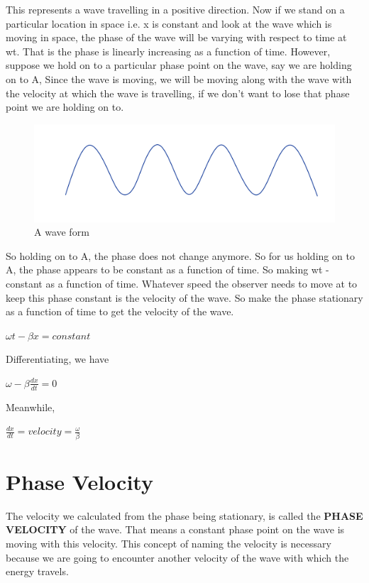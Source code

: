 This represents a wave travelling in a positive direction. Now if we stand on a particular location in space i.e. x is constant and look at the wave which is moving in space, the phase of the wave will be varying with respect to time at wt. That is the phase is linearly increasing as a function of time. However, suppose we hold on to a particular phase point on the wave, say we are holding on to A, Since the wave is moving, we will be moving along with the wave with the velocity at which the wave is travelling, if we don't want to lose that phase point we are holding on to.
\begin{figure}[h]
\centering
\includegraphics[width=1\linewidth]{./graphics/Bello264}
\caption{A wave form}
\end{figure}

So holding on to A, the phase does not change anymore. So for us holding on to A, the phase appears to be constant as a function of time. So making wt -   constant as a function of time. Whatever speed the observer needs to move at to keep this phase constant is the velocity of the wave. So make the phase stationary as a function of time to get the velocity of the wave.
\begin{center}
$\omega t-\beta x = constant$
\end{center}

Differentiating, we have
\begin{center}
$\omega-\beta\frac{dx}{dt}=0$
\end{center}

Meanwhile, 
\begin{center}
$\frac{dx}{dt}=velocity=\frac{\omega}{\beta}$
\end{center}

\section{\textbf{Phase Velocity}}
The velocity we calculated from the phase being stationary, is called the \textbf{PHASE VELOCITY} of the wave. That means a constant phase point on the wave is moving with this velocity. This concept of naming the velocity is necessary because we are going to encounter another velocity of the wave with which the energy travels.

